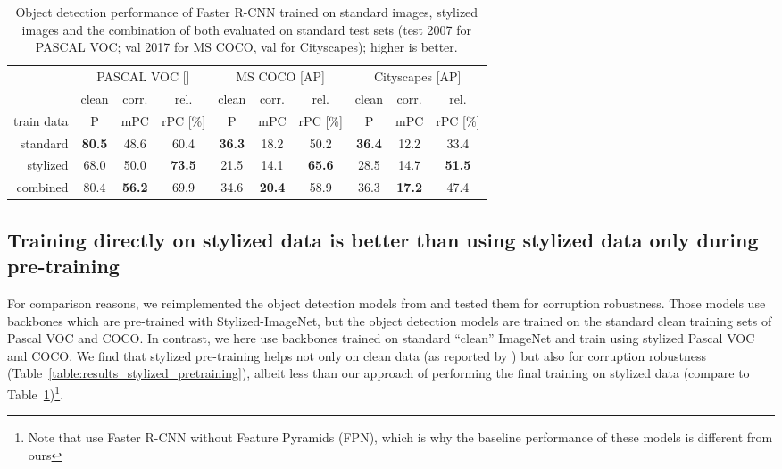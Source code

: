 \documentclass{article}
\newcommand{\highlight}[1]{{\cellcolor{gray.220} #1}}
\begin{document}
\begin{table}[t]\footnotesize
\begin{center}
\begin{tabular}{r|ccc|ccc|ccc}
\toprule
 &\multicolumn{3}{c|}{PASCAL VOC []} & \multicolumn{3}{c|}{MS COCO [AP]} & \multicolumn{3}{c}{Cityscapes [AP]} \\
& clean & \highlight{corr.} & rel. & clean & \highlight{corr.} & rel. & clean & \highlight{corr.} & rel.\\
train data & P & \highlight{mPC} & rPC [\%] & P & \highlight{mPC} & rPC [\%] & P & \highlight{mPC} & rPC [\%] \\
\hline
standard & \textbf{80.5} & \highlight{48.6} & 60.4 & \textbf{36.3} & \highlight{18.2} & 50.2 & \textbf{36.4} & \highlight{12.2} & 33.4 \\
\hline
stylized & 68.0 & \highlight{50.0} & \textbf{73.5} & 21.5 & \highlight{14.1} & \textbf{65.6} & 28.5 & \highlight{14.7} & \textbf{51.5}\\
combined & 80.4 & \highlight{\textbf{56.2}} & 69.9 & 34.6 & \highlight{\textbf{20.4}} & 58.9 & 36.3 & \highlight{\textbf{17.2}} & 47.4\\
\bottomrule
\end{tabular}
\caption{Object detection performance of Faster R-CNN trained on standard images, stylized images and the combination of both evaluated on standard test sets (test 2007 for PASCAL VOC; val 2017 for MS COCO, val for Cityscapes); higher is better.}
\label{table:results_stylized}
\vspace{-0.3cm}
\end{center}
\end{table}

\subsection{Training directly on stylized data is better than using stylized data only during pre-training}

For comparison reasons, we reimplemented the object detection models from \citet{geirhos2019imagenettrained} and tested them for corruption robustness. Those models use backbones which are pre-trained with Stylized-ImageNet, but the object detection models are trained on the standard clean training sets of Pascal VOC and COCO. In contrast, we here use backbones trained on standard ``clean'' ImageNet and train using stylized Pascal VOC and COCO. We find that stylized pre-training helps not only on clean data (as reported by \cite{geirhos2019imagenettrained}) but also for corruption robustness (Table~\ref{table:results_stylized_pretraining}), albeit less than our approach of performing the final training on stylized data (compare to Table~\ref{table:results_stylized})\footnote{Note that \cite{geirhos2019imagenettrained} use Faster R-CNN without Feature Pyramids (FPN), which is why the baseline performance of these models is different from ours}.
\end{document}
